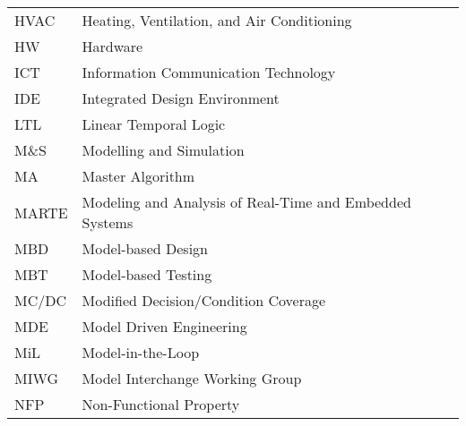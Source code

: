 \begin{longtable}{ll}
HVAC    &Heating, Ventilation, and Air Conditioning\\
HW      &Hardware\\
ICT	&Information Communication Technology\\
IDE	&Integrated Design Environment\\
LTL & Linear Temporal Logic \\
M\&S    &Modelling and Simulation\\
MA & Master Algorithm \\
MARTE & Modeling and Analysis of Real-Time and Embedded Systems\\
MBD     &Model-based Design\\
MBT & Model-based Testing\\
MC/DC   &Modified Decision/Condition Coverage\\
MDE & Model Driven Engineering \\
MiL 	&Model-in-the-Loop\\
MIWG & Model Interchange Working Group\\
NFP & Non-Functional Property \\

\end{longtable}

